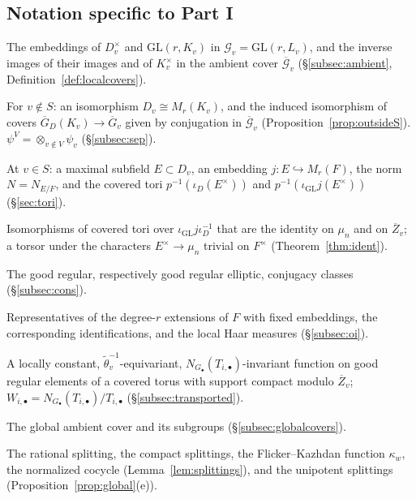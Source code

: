 \documentclass[12pt]{article}
\newcommand{\ov}[1]{\overline{#1}}
\newcommand{\A}{\mathbb{A}}
\newcommand{\Iso}{\operatorname{Iso}}
\newcommand{\GL}{\mathrm{GL}}
\newcommand{\Gb}{\ov{G}}
\newcommand{\Zb}{\ov{Z}}
\newcommand{\GDb}{\ov{G}_D}
\newcommand{\ks}{\kappa^{*}}
\newcommand{\Eb}{\ov{E}}
\newcommand{\cG}{\mathcal{G}}
\newcommand{\cGb}{\ov{\mathcal{G}}}
\newcommand{\iD}{\iota_D}
\newcommand{\iG}{\iota_{\GL}}
\newcommand{\jj}{\jmath}
\theoremstyle{plain}
\theoremstyle{definition}
\begin{document}


\subsection{Notation specific to Part I}\label{subsec:glossI}
\begin{description}[style=nextline,leftmargin=1.5em]
\item[$\iD$, $\iG$; $\GDb(K_v)$, $\Gb_v$, $\Zb_v$] The embeddings of $D_v^\times$ and $\GL(r,K_v)$ in $\cG_v=\GL(r,L_v)$, and the inverse images of their images and of $K_v^\times$ in the ambient cover $\cGb_v$ (\S\ref{subsec:ambient}, Definition~\ref{def:localcovers}).
\item[$\alpha_v$, $\psi_v$] For $v\notin S$: an isomorphism $D_v\cong M_r(K_v)$, and the induced isomorphism of covers $\GDb(K_v)\to\Gb_v$ given by conjugation in $\cGb_v$ (Proposition~\ref{prop:outsideS}). $\psi^V=\otimes_{v\notin V}\psi_v$ (\S\ref{subsec:sep}).
\item[$E$, $j$, $N$; $\Eb_D$, $\Eb_{\GL}$] At $v\in S$: a maximal subfield $E\subset D_v$, an embedding $j:E\hookrightarrow M_r(F)$, the norm $N=N_{E/F}$, and the covered tori $p^{-1}(\iD(E^\times))$ and $p^{-1}(\iG j(E^\times))$ (\S\ref{sec:tori}).
\item[$\Iso_{\Zb}(\Eb_D,\Eb_{\GL})$] Isomorphisms of covered tori over $\iG j\iD^{-1}$ that are the identity on $\mu_n$ and on $\Zb_v$; a torsor under the characters $E^\times\to\mu_n$ trivial on $F^\times$ (Theorem~\ref{thm:ident}).
\item[$\mathcal C^{g}(\GDb(K_v))$, $\mathcal C^{g}_{\mathrm{ell}}(\Gb_v)$] The good regular, respectively good regular elliptic, conjugacy classes (\S\ref{subsec:cons}).
\item[$E_i$, $j_i$, $\jj_i$; $dg_D$, $dg$, $dt_i$] Representatives of the degree-$r$ extensions of $F$ with fixed embeddings, the corresponding identifications, and the local Haar measures (\S\ref{subsec:oi}).
\item[Admissible function; $W_{i,\bullet}$] A locally constant, $\tilde\theta_v^{-1}$-equivariant, $N_{G_\bullet}(T_{i,\bullet})$-invariant function on good regular elements of a covered torus with support compact modulo $\Zb_v$; $W_{i,\bullet}=N_{G_\bullet}(T_{i,\bullet})/T_{i,\bullet}$ (\S\ref{subsec:transported}).
\item[$\cGb(\A_L)$, $\GDb(\A_K)$, $\Gb(\A_K)$, $\Zb(\A_K)$] The global ambient cover and its subgroups (\S\ref{subsec:globalcovers}).
\item[$\iota$, $\ks_v$, $\kappa_w$, $\tau_w$, $s_N$] The rational splitting, the compact splittings, the Flicker--Kazhdan function $\kappa_w$, the normalized cocycle (Lemma~\ref{lem:splittings}), and the unipotent splittings (Proposition~\ref{prop:global}(e)).

\end{description}
\end{document}
